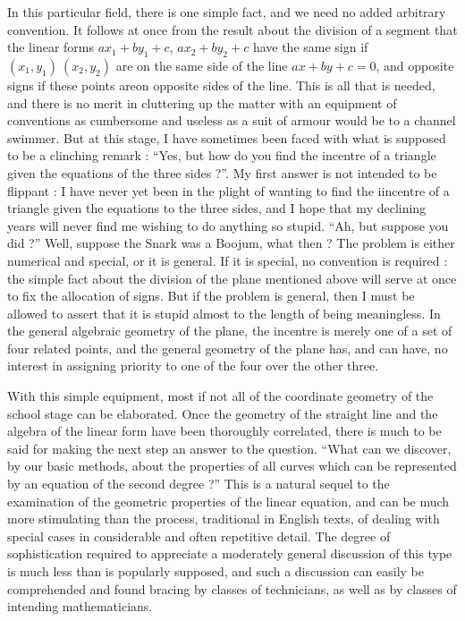In this particular field, there is one simple fact, and we need no
added arbitrary convention. It follows at once from the result about
the division of a segment that the linear forms $ax_1 + by_1 + c$,
$ax_2 + by_2 + c$ have the same sign if $(x_1, y_1)~ (x_2, y_2)$ are
on the same side of the line $ax+by+c=0$, and opposite signs if these
points are\pageoriginale on opposite sides of the line. This is all
that is needed, and there is no merit in cluttering up the matter with
an equipment of conventions as cumbersome and useless as a suit of
armour would be to a channel swimmer. But at this stage, I have
sometimes been faced with what is supposed to be a clinching remark :
``Yes, but how do you find the incentre of a triangle given the
equations of the three sides ?''. My first answer is not intended to
be flippant : I have never yet been in the plight of wanting to find
the iincentre of a triangle given the equations to the three sides,
and I hope that my declining years will never find me wishing to do
anything so stupid. ``Ah, but suppose you did ?'' Well, suppose the
Snark was a Boojum, what then ? The problem is either numerical and
special, or it is general. If it is special, no convention is required
: the simple fact about the division of the plane mentioned above will
serve at once to fix the allocation of signs. But if the problem is
general, then I must be allowed to assert that it is stupid almost
to the length of being meaningless. In the general algebraic geometry
of the plane, the incentre is merely one of a set of four related
points, and the general geometry of the plane has, and can have, no
interest in assigning priority to one of the four over the other
three.


With this simple equipment, most if not all of the coordinate geometry
of the school stage can be elaborated. Once the geometry of the
straight line and the algebra of the linear form have been thoroughly
correlated, there is much to be said for making the next step an
answer to the question. ``What can we discover, by our basic methods,
about the properties of all curves which can be represented by an
equation of the second degree ?'' This is a natural sequel to the
examination of the geometric properties of the linear equation, and
can be much more stimulating than the process, traditional in English
texts, of dealing with special cases in considerable and often
repetitive detail. The degree of sophistication required to appreciate
a moderately general discussion of this type is much less than is
popularly supposed, and such a discussion can easily be comprehended
and found bracing by classes of technicians, as well as by classes of
intending mathematicians.

